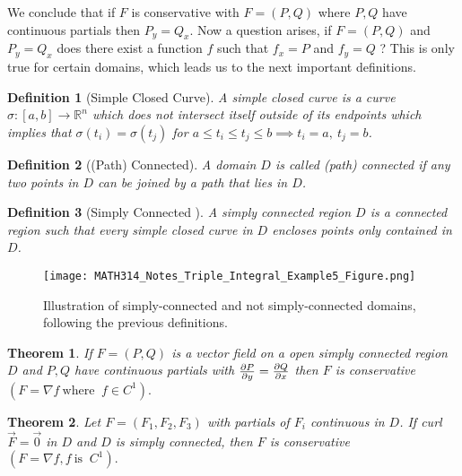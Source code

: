\documentclass[
	12pt,
	]{article}
\newcommand{\R}{\mathbb{R}}
\theoremstyle{custom}
\newtheorem{theorem}{Theorem}[section]
\theoremstyle{custom}
\theoremstyle{custom}
\theoremstyle{custom}
\newtheorem{definition}{Definition}[section]
\theoremstyle{custom}
\theoremstyle{definition}
\theoremstyle{example}
\theoremstyle{note}
\theoremstyle{remark}
\theoremstyle{example}
\newcounter{theo}[section]\setcounter{theo}{0}
\numberwithin{equation}{subsection}
\begin{document}
  				\noindent We conclude that if $F$ is conservative with $F= (P,Q)$ where $P,Q$ have continuous partials then $P_{y} = Q_{x}$. Now a question arises, if $F=(P,Q)$ and $P_{y} = Q_{x}$ does there exist a function $f$ such that $f_{x} = P $ and $f_{y} = Q$ ? This is only true for certain domains, which leads us to the next important definitions.
  				
  				\begin{definition}[Simple Closed Curve]
  					A simple closed curve is a curve $\sigma : [a,b] \to \R^{n}$ which does not intersect itself outside of its endpoints which implies that $\sigma(t_{i})= \sigma(t_{j})$ for $a \le t_{i} \le t_{j} \le b \implies t_{i} = a ,  \ t_{j} = b$.
  				
  				\end{definition}
  				
  				\begin{definition}[(Path) Connected]
  					A domain $D$ is called (path) connected if any two points in $D$ can be joined by a path that lies in $D$.
  				\end{definition}
  				
  				\begin{definition}[Simply Connected ]
  					A simply connected region $D$ is a connected region such that every simple closed curve in $D$ encloses points only contained in $D$. 
  				\end{definition}
  				\vspace{-0.5cm}
  				\begin{figure}[H]
  					\centering
  					\texttt{[image: MATH314\_Notes\_Triple\_Integral\_Example5\_Figure.png]}
  					\captionsetup{margin=1cm, justification=raggedright}\caption{Illustration of simply-connected and not simply-connected domains, following the previous definitions.}
  				\end{figure}
  				
  				\begin{theorem}
  					If $F = (P,Q)$ is a vector field on a open simply connected region $D$ and $P,Q$ have continuous partials with $\pdv{P}{y} = \pdv{Q}{x}$ then $F$ is conservative $(F = \nabla f \ \text{where } \ f \in C^{1}).$
  				\end{theorem}
  				
  				\begin{theorem}
  					Let $F = (F_{1}, F_{2}, F_{3})$ with partials of $F_{i}$ continuous in $D$. If curl$\vec{F} = \vec{0}$ in $D$ and $D$ is simply connected, then $F$ is conservative $(F = \nabla f, f \ \text{is }\ C^{1}).$
  				\end{theorem}
  				
\end{document}
